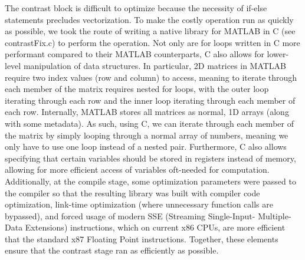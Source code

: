 










The contrast block is difficult to optimize because the necessity of if-else statements precludes 
vectorization. To make the costly operation run as quickly as possible, we took the route of 
writing a native library for MATLAB in C (see contrastFix.c) to perform the operation. Not only 
are for loops written in C more performant compared to their MATLAB counterparts, C also allows 
for lower-level manipulation of data structures. In particular, 2D matrices in MATLAB require 
two index values (row and column) to access, meaning to iterate through each member of the matrix 
requires nested for loops, with the outer loop iterating through each row and the inner loop 
iterating through each member of each row. Internally, MATLAB stores all matrices as normal, 1D 
arrays (along with some metadata). As such, using C, we can iterate through each member of the matrix 
by simply looping through a normal array of numbers, meaning we only have to use one loop instead 
of a nested pair. Furthermore, C also allows specifying that certain variables should be stored in 
registers instead of memory, allowing for more efficient access of variables oft-needed for computation. 
Additionally, at the compile stage, some optimization parameters were passed to the compiler so that 
the resulting library was built with compiler code optimization, link-time optimization (where 
unnecessary function calls are bypassed), and forced usage of modern SSE (Streaming Single-Input-
Multiple-Data Extensions) instructions, which on current x86 CPUs, are more efficient that the 
standard x87 Floating Point instructions. Together, these elements ensure that the contrast stage 
ran as efficiently as possible.